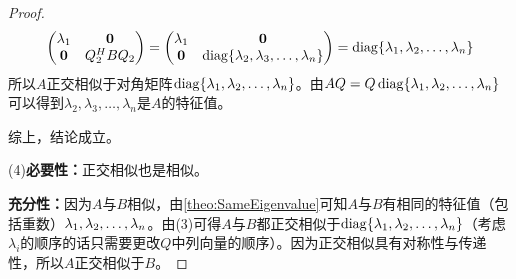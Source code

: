 \begin{proof}
\begin{align*}
\begin{pmatrix}
			\lambda_1 & \mathbf{0} \\
			\mathbf{0} & Q_2^HBQ_2
		\end{pmatrix}
		=
		\begin{pmatrix}
			\lambda_1 & \mathbf{0} \\
			\mathbf{0} & \operatorname{diag}\{\lambda_2,\lambda_3,\dots,\lambda_n\}
		\end{pmatrix}
		=\operatorname{diag}\{\lambda_1, \lambda_2, \dots, \lambda_{n}\}
	\end{align*}
	所以$A$正交相似于对角矩阵$\operatorname{diag}\{\lambda_1, \lambda_2, \dots, \lambda_{n}\}$。由$AQ=Q\operatorname{diag}\{\lambda_1, \lambda_2, \dots, \lambda_{n}\}$可以得到$\lambda_2,\lambda_3,\dots,\lambda_n$是$A$的特征值。\par
	综上，结论成立。\par
	(4)\textbf{必要性：}正交相似也是相似。\par
	\textbf{充分性：}因为$A$与$B$相似，由\cref{theo:SameEigenvalue}可知$A$与$B$有相同的特征值（包括重数）$\lambda_1, \lambda_2, \dots, \lambda_{n}$。由(3)可得$A$与$B$都正交相似于$\operatorname{diag}\{\lambda_1, \lambda_2, \dots, \lambda_{n}\}$（考虑$\lambda_i$的顺序的话只需要更改$Q$中列向量的顺序）。因为正交相似具有对称性与传递性，所以$A$正交相似于$B$。
\end{proof}
